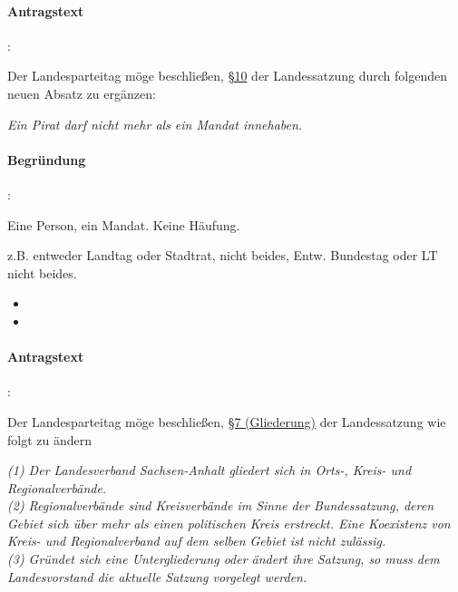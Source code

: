 

\paragraph{Antragstext}:

Der Landesparteitag möge beschließen, \href{http://wiki.piratenpartei.de/LSA:Satzung#.C2.A7_10_-_Bewerberaufstellung_f.C3.BCr_die_Wahlen_zu_Volksvertretungen}{§10} der Landessatzung durch folgenden neuen Absatz zu ergänzen:

\textit{Ein Pirat darf nicht mehr als ein Mandat innehaben.}

\paragraph{Begründung}:

Eine Person, ein Mandat. Keine Häufung.

z.B. entweder Landtag oder Stadtrat, nicht beides, Entw. Bundestag oder LT nicht beides.


\label{satzung:gliederungen3}
\begin{itemize}
\item {}
\item {}
\end{itemize}

\paragraph{Antragstext}:

Der Landesparteitag möge beschließen, \href{http://wiki.piratenpartei.de/LSA:Satzung#.C2.A7_7_-_Gliederung}{§7 (Gliederung)} der Landessatzung wie folgt zu ändern

\textit{(1) Der Landesverband Sachsen-Anhalt gliedert sich in Orts-, Kreis- und Regionalverbände.\\
(2) Regionalverbände sind Kreisverbände im Sinne der Bundessatzung, deren Gebiet sich über mehr als einen politischen Kreis erstreckt. Eine Koexistenz von Kreis- und Regionalverband auf dem selben Gebiet ist nicht zulässig.\\
(3) Gründet sich eine Untergliederung oder ändert ihre Satzung, so muss dem Landesvorstand die aktuelle Satzung vorgelegt werden.}

